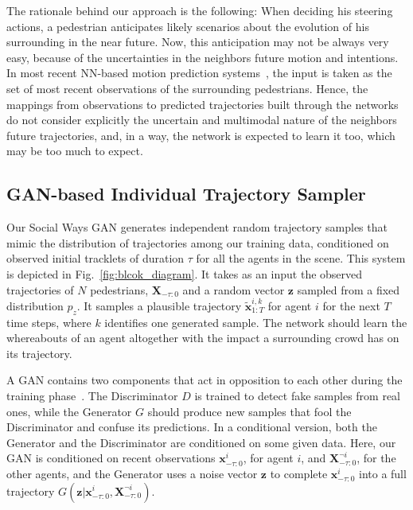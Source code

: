 \documentclass[10pt,twocolumn,letterpaper]{article}
\begin{document}
The rationale behind our approach is the following: When deciding his steering actions, a pedestrian anticipates likely scenarios about the evolution of his surrounding in the near future. Now, this anticipation may not be always very easy, because of the uncertainties in the neighbors future motion and intentions. In most recent NN-based motion prediction systems~\cite{SocialAttention2018Vemula,CIDNN2018,Pfeiffer2018}, the input is taken as the set of most recent observations of the surrounding pedestrians. Hence, the mappings from observations to predicted trajectories built through the networks do not consider explicitly the uncertain and multimodal nature of the neighbors future trajectories, and, in a way, the network is expected to learn it too, which may be too much to expect.   

\vspace{-0.1cm}
\subsection{GAN-based Individual Trajectory Sampler}
\label{subsec:GAN}

Our Social Ways GAN generates independent random trajectory samples that mimic the distribution of trajectories among our training data, conditioned on observed initial tracklets of duration $\tau$ for all the agents in the scene. This system is depicted in Fig.~\ref{fig:blcok_diagram}. It takes as an input the observed trajectories of $N$ pedestrians, $\mathbf{X}_{-\tau: 0}$ and a random vector $\mathbf{z}$ sampled from a fixed distribution $p_z$. It samples a plausible trajectory $\tilde{\mathbf{x}}^{i,k}_{1: T}$ for agent $i$ for the next $T$ time steps, where $k$ identifies one generated sample. The network should learn the whereabouts of an agent altogether with the impact a surrounding crowd has on its trajectory.

A GAN contains two components that act in opposition to each other during the training phase~\cite{Goodfellow2014}. The Discriminator $D$ is trained to detect fake samples from real ones, while the Generator $G$ should produce new samples that fool the Discriminator and confuse its predictions. In a conditional version, both the Generator and the Discriminator are conditioned on some given data. Here, our GAN is conditioned on recent observations  $\mathbf{x}^i_{-\tau: 0}$, for agent $i$, and  $\mathbf{X}^{\neg i}_{-\tau:0}$, for the other agents, and the Generator uses a noise vector $\mathbf z$ to complete $\mathbf{x}^i_{-\tau: 0}$ into a full trajectory $G(\mathbf z|\mathbf{x}^i_{-\tau: 0},\mathbf{X}^{\neg i}_{-\tau:0})$.
\end{document}

